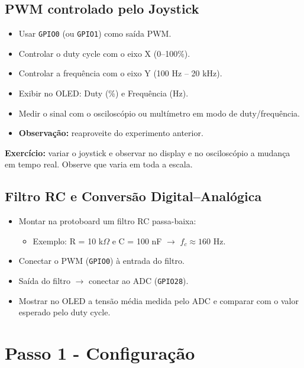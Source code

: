 \documentclass{article}
\begin{document}
\subsection{PWM controlado pelo Joystick}

\begin{itemize}
    \item Usar \texttt{GPIO0} (ou \texttt{GPIO1}) como saída PWM.
    \item Controlar o duty cycle com o eixo X (0--100\%).
    \item Controlar a frequência com o eixo Y (100 Hz -- 20 kHz).
    \item Exibir no OLED: Duty (\%) e Frequência (Hz).
    \item Medir o sinal com o osciloscópio ou multímetro em modo de duty/frequência.
    \item \textbf{Observação:} reaproveite do experimento anterior.
\end{itemize}

\noindent
\textbf{Exercício:} variar o joystick e observar no display e no osciloscópio a mudança em tempo real. Observe que varia em toda a escala. 

\subsection{Filtro RC e Conversão Digital–Analógica}

\begin{itemize}
    \item Montar na protoboard um filtro RC passa-baixa:
    \begin{itemize}
        \item Exemplo: R = 10 k$\Omega$ e C = 100 nF $\rightarrow$ $f_c \approx 160$ Hz.
    \end{itemize}
    \item Conectar o PWM (\texttt{GPIO0}) à entrada do filtro.
    \item Saída do filtro $\rightarrow$ conectar ao ADC (\texttt{GPIO28}).
    \item Mostrar no OLED a tensão média medida pelo ADC e comparar com o valor esperado pelo duty cycle.
\end{itemize}

\section{Passo 1 - Configuração}
\end{document}

